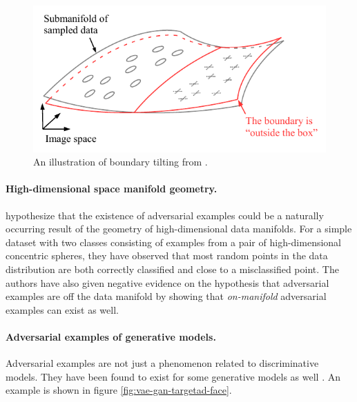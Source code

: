 \documentclass[twocolumn]{article}
\begin{document}
\begin{figure}[H]
	\begin{center}
		\includegraphics[width=\columnwidth]{figures/adversarial-examples/tanay-newPerspective.pdf}
	\end{center}
	\caption{An illustration of boundary tilting from \citet{Tanay:2016:ABTPPAE}.}
	\label{fig:tanay-boundary-tilting}
\end{figure}

\paragraph{High-dimensional space manifold geometry.} \citet{Gilmer:2018:AS} hypothesize that the existence of adversarial examples could be a naturally occurring result of the geometry of high-dimensional data manifolds. For a simple dataset with two classes consisting of examples from a pair of high-dimensional concentric spheres, they have observed that most random points in the data distribution are both correctly classified and close to a misclassified point. The authors have also given negative evidence on the hypothesis that adversarial examples are off the data manifold by showing that \textit{on-manifold} adversarial examples can exist as well.

\paragraph{Adversarial examples of generative models.} Adversarial examples are not just a phenomenon related to discriminative models. They have been found to exist for some generative models as well \citep{Goodfellow:2014:EHAE,Kos:2018:AEGM}. An example is shown in figure \ref{fig:vae-gan-targetad-face}.
\end{document}
